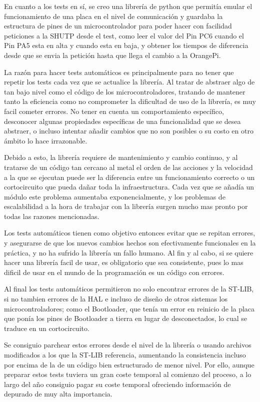 \documentclass{report}
\begin{document}
\par \vspace{0.3cm}
En cuanto a los tests en sí, se creo una librería de python que permitía emular el funcionamiento de una placa en el nivel de comunicación y guardaba la estructura de pines de un microcontrolador para poder hacer con facilidad peticiones a la SHUTP desde el test, como leer el valor del Pin PC6 cuando el Pin PA5 esta en alta y cuando esta en baja, y obtener los tiempos de diferencia desde que se envia la petición hasta que llega el cambio a la OrangePi. 
\par \vspace{0.3cm}
La razón para hacer tests automáticos es principalmente para no tener que repetir los tests cada vez que se actualice la librería. Al tratar de abstraer algo de tan bajo nivel como el código de los microcontroladores, tratando de mantener tanto la eficiencia como no comprometer la dificultad de uso de la librería, es muy facil cometer errores. No tener en cuenta un comportamiento específico, desconocer algunas propiedades específicas de una funcionalidad que se desea abstraer, o incluso intentar añadir cambios que no son posibles o su costo en otro ámbito lo hace irrazonable. 
\par
Debido a esto, la librería requiere de mantenimiento y cambio continuo, y al tratarse de un código tan cercano al metal el orden de las acciones y la velocidad a la que se ejecutan puede ser la diferencia entre un funcionamiento correcto o un cortocircuito que pueda dañar toda la infraestructura. Cada vez que se añadía un módulo este problema aumentaba exponencialmente, y los problemas de escalabilidad a la hora de trabajar con la librería surgen mucho mas pronto por todas las razones mencionadas. 
\par \vspace{0.3cm}
Los tests automáticos tienen como objetivo entonces evitar que se repitan errores, y asegurarse de que los nuevos cambios hechos son efectivamente funcionales en la práctica, y no ha sufrido la librería un fallo humano. Al fin y al cabo, si se quiere hacer una librería facil de usar, es obligatorio que sea consistente, pues lo mas dificil de usar en el mundo de la programación es un código con errores. 
\par
Al final los tests automáticos permitieron no solo encontrar errores de la ST-LIB, si no tambien errores de la HAL e incluso de diseño de otros sistemas los microcontroladores; como el Bootloader, que tenía un error en reinicio de la placa que ponía los pines de Bootloader a tierra en lugar de desconectados, lo cual se traduce en un cortocircuito.
\par 
Se consiguio parchear estos errores desde el nivel de la librería o usando archivos modificados a los que la ST-LIB referencia, aumentando la consistencia incluso por encima de la de un código bien estructurado de menor nivel. Por ello, aunque preparar estos tests tuviera un gran coste temporal al comienzo del proceso, a lo largo del año consiguio pagar su coste temporal ofreciendo información de depurado de muy alta importancia. 



\end{document}
